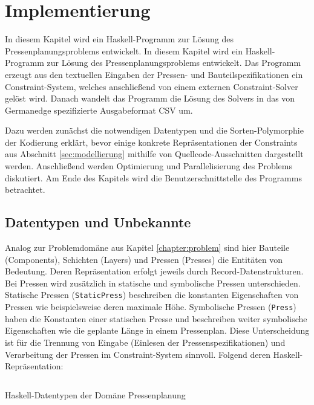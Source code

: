\chapter{Implementierung}
\label{chapter:implementierung}
In diesem Kapitel wird ein Haskell-Programm zur Lösung des Pressenplanungsproblems entwickelt.
In diesem Kapitel wird ein Haskell-Programm zur Lösung des Pressenplanungsproblems entwickelt.
Das Programm erzeugt aus den textuellen Eingaben der Pressen- und Bauteilspezifikationen ein Constraint-System,
welches anschließend von einem externen Constraint-Solver gelöst wird.
Danach wandelt das Programm die Lösung des Solvers in das von Germanedge spezifizierte Ausgabeformat CSV um.

Dazu werden zunächst die notwendigen Datentypen und die Sorten-Polymorphie der Kodierung erklärt, bevor einige konkrete Repräsentationen der Constraints aus
Abschnitt \ref{sec:modellierung} mithilfe von Quellcode-Ausschnitten dargestellt werden.
Anschließend werden Optimierung und Parallelisierung des Problems diskutiert.
Am Ende des Kapitels wird die Benutzerschnittstelle des Programms betrachtet.


\section{Datentypen und Unbekannte}
\label{sec:datatypes}
Analog zur Problemdomäne aus Kapitel \ref{chapter:problem} sind hier Bauteile (Components), Schichten (Layers) und Pressen (Presses)
die Entitäten von Bedeutung.
Deren Repräsentation erfolgt jeweils durch Record-Datenstrukturen.
Bei Pressen wird zusätzlich in statische und symbolische Pressen unterschieden.
Statische Pressen (\texttt{StaticPress}) beschreiben die konstanten Eigenschaften von Pressen wie beispielsweise deren maximale Höhe.
Symbolische Pressen (\texttt{Press}) haben die Konstanten einer statischen Presse und beschreiben weiter symbolische Eigenschaften wie die geplante Länge in einem Pressenplan.
Diese Unterscheidung ist für die Trennung von Eingabe (Einlesen der Pressenspezifikationen) und Verarbeitung der Pressen im Constraint-System sinnvoll.
Folgend deren Haskell-Repräsentation:

\begin{listing}[H]
    \inputminted[linenos=true]{haskell}{Code/Implementierung/Datatypes.hs}
    \caption{Haskell-Datentypen der Domäne Pressenplanung}
    \label{listing:datatypes}
\end{listing}

